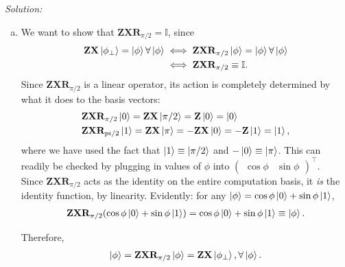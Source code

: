\documentclass{book}
\theoremstyle{definition}
\newcommand{\nn}{\nonumber}
\newcommand{\X}{\mathbf{X}}
\newcommand{\Id}{\mathbb{I}}
\newcommand{\Z}{\mathbf{Z}}
\begin{document}
\newpage
\noindent \textit{Solution:} 
\begin{enumerate}[(a)]
	\item We want to show that $\Z\X \mathbf{R}_{\pi/2} = \Id$, since 
	\begin{align}
	\Z\X\ket{\phi_\perp} = \ket{\phi} \forall \ket{\phi} &\iff \Z \X \mathbf{R}_{\pi/2}\ket{\phi} = \ket{\phi} \forall \ket{\phi}\nn\\
	&\iff \Z \X \mathbf{R}_{\pi/2} \equiv \Id.
	\end{align}
	Since $\Z \X \mathbf{R}_{\pi/2}$ is a linear operator, its action is completely determined by what it does to the basis vectors:
	\begin{align}
	&\Z \X \mathbf{R}_{\pi/2}\ket{0} = \Z \X \ket{\pi/2} = \Z \ket{0} = \ket{0}\nn\\
	&\Z \X \mathbf{R}_{pi/2}\ket{1} = \Z \X \ket{\pi} = -\Z \X \ket{0} = -\Z\ket{1} = \ket{1},
	\end{align}
	where we have used the fact that $\ket{1} \equiv \ket{\pi/2}$ and $-\ket{0} \equiv \ket{\pi}$. This can readily be checked by plugging in values of $\phi$ into $\begin{pmatrix}
	\cos \phi & \sin\phi
	\end{pmatrix}^\top$. \\
	
	Since $\Z \X \mathbf{R}_{\pi/2}$ acts as the identity on the entire computation basis, it \textit{is} the identity function, by linearity. Evidently: for any $\ket{\phi} = \cos\phi \ket{0} + \sin\phi \ket{1}$, 
	\begin{align}
	\Z \X \mathbf{R}_{\pi/2}(\cos\phi \ket{0} + \sin\phi \ket{1}) = \cos\phi \ket{0} + \sin\phi \ket{1} \equiv \ket{\phi}.
	\end{align}
	
	
	
	Therefore,
	\begin{align}
	\ket{\phi} = \Z \X \mathbf{R}_{\pi/2}\ket{\phi} = \Z \X \ket{\phi_\perp}, \forall \ket{\phi}.
	\end{align}
	

\end{enumerate}
\end{document}
